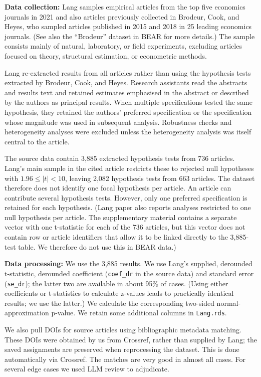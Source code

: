 \documentclass[
  11pt,
]{article}
\begin{document}
\textbf{Data collection:} Lang samples empirical articles from the top
five economics journals in 2021 and also articles previously collected
in Brodeur, Cook, and Heyes, who sampled articles published in 2015 and
2018 in 25 leading economics journals. (See also the ``Brodeur'' dataset
in BEAR for more details.) The sample consists mainly of natural,
laboratory, or field experiments, excluding articles focused on theory,
structural estimation, or econometric methods.

Lang re-extracted results from all articles rather than using the
hypothesis tests extracted by Brodeur, Cook, and Heyes. Research
assistants read the abstracts and results text and retained estimates
emphasised in the abstract or described by the authors as principal
results. When multiple specifications tested the same hypothesis, they
retained the authors' preferred specification or the specification whose
magnitude was used in subsequent analysis. Robustness checks and
heterogeneity analyses were excluded unless the heterogeneity analysis
was itself central to the article.

The source data contain 3,885 extracted hypothesis tests from 736
articles. Lang's main sample in the cited article restricts these to
rejected null hypotheses with \(1.96 \leq |t| < 10\), leaving 2,082
hypothesis tests from 663 articles. The dataset therefore does not
identify one focal hypothesis per article. An article can contribute
several hypothesis tests. However, only one preferred specification is
retained for each hypothesis. (Lang paper also reports analyses
restricted to one null hypothesis per article. The supplementary
material contains a separate vector with one t-statistic for each of the
736 articles, but this vector does not contain row or article
identifiers that allow it to be linked directly to the 3,885-test table.
We therefore do not use this in BEAR data.)

\textbf{Data processing:} We use the 3,885 results. We use Lang's
supplied, derounded t-statistic, derounded coefficient
(\texttt{coef\_dr} in the source data) and standard error
(\texttt{se\_dr}); the latter two are available in about 95\% of cases.
(Using either coefficients or t-statistics to calculate z-values leads
to practically identical results; we use the latter.) We calculate the
corresponding two-sided normal-approximation p-value. We retain some
additional columns in \texttt{Lang.rds}.

We also pull DOIs for source articles using bibliographic metadata
matching. These DOIs were obtained by us from Crossref, rather than
supplied by Lang; the saved assignments are preserved when reprocessing
the dataset. This is done automatically via Crossref. The matches are
very good in almost all cases. For several edge cases we used LLM review
to adjudicate.
\end{document}
